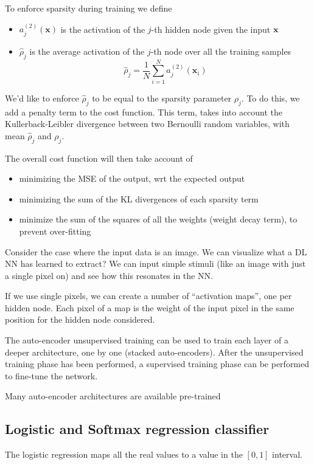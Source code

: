 \documentclass[oneside,onecolumn]{report}
\begin{document}
To enforce sparsity during training we define
\begin{itemize}
    \item $a_j^{(2)}(\bm x)$ is the activation of the $j$-th hidden node given the input $\bm x$
    \item $\widehat \rho_j$ is the average activation of the $j$-th node over all the training samples
    $$ \widehat \rho_j = \frac{1}{N} \sum_{i = 1}^N a_j^{(2)}(\bm x_i) $$
\end{itemize}

We'd like to enforce $\widehat \rho_j$ to be equal to the sparsity parameter $\rho_j$.
To do this, we add a penalty term to the cost function.
This term, takes into account the Kullerback-Leibler divergence between two Bernoulli random variables, with mean $\widehat \rho_j$ and $\rho_j$.

The overall cost function will then take account of
\begin{itemize}
    \item minimizing the MSE of the output, wrt the expected output
    \item minimizing the sum of the KL divergences of each sparsity term
    \item minimize the sum of the squares of all the weights (weight decay term), to prevent over-fitting
\end{itemize}

Consider the case where the input data is an image.
We can visualize what a DL NN has learned to extract?
We can input simple stimuli (like an image with just a single pixel on) and see how this resonates in the NN.

If we use single pixels, we can create a number of ``activation maps'', one per hidden node.
Each pixel of a map is the weight of the input pixel in the same position for the hidden node considered.

The auto-encoder unsupervised training can be used to train each layer of a deeper architecture, one by one (stacked auto-encoders).
After the unsupervised training phase has been performed, a supervised training phase can be performed to fine-tune the network.

Many auto-encoder architectures are available pre-trained


\subsection{Logistic and Softmax regression classifier}
The logistic regression maps all the real values to a value in the $[0,1]$ interval.
\end{document}
